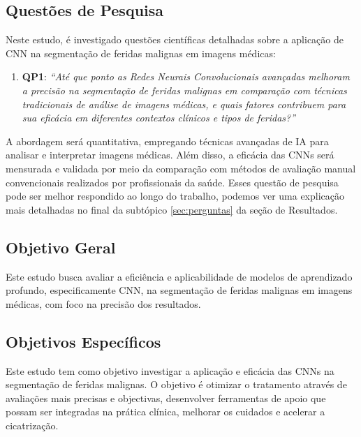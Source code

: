  \subsection{Questões de Pesquisa}
Neste estudo, é investigado questões científicas detalhadas sobre a aplicação de \ac{CNN} na segmentação de feridas malignas em imagens médicas:

\begin{enumerate}
  \item \textbf{QP1}: \textit{“Até que ponto as Redes Neurais Convolucionais avançadas melhoram a precisão na segmentação de feridas malignas em comparação com técnicas tradicionais de análise de imagens médicas, e quais fatores contribuem para sua eficácia em diferentes contextos clínicos e tipos de feridas?”}
\end{enumerate}

A abordagem será quantitativa, empregando técnicas avançadas de \ac{IA} para analisar e interpretar imagens médicas. Além disso, a eficácia das \ac{CNN}s será mensurada e validada por meio da comparação com métodos de avaliação manual convencionais realizados por profissionais da saúde. Esses questão de pesquisa pode ser melhor respondido ao longo do trabalho, podemos ver uma explicação mais detalhadas no final da subtópico \ref{sec:perguntas} da seção de Resultados.


\subsection{Objetivo Geral}
Este estudo busca avaliar a eficiência e aplicabilidade de modelos de aprendizado profundo, especificamente \ac{CNN}, na segmentação de feridas malignas em imagens médicas, com foco na precisão dos resultados.

\subsection{Objetivos Específicos}
Este estudo tem como objetivo investigar a aplicação e eficácia das \acp{CNN} na segmentação de feridas malignas. O objetivo é otimizar o tratamento através de avaliações mais precisas e objectivas, desenvolver ferramentas de apoio que possam ser integradas na prática clínica, melhorar os cuidados e acelerar a cicatrização.

